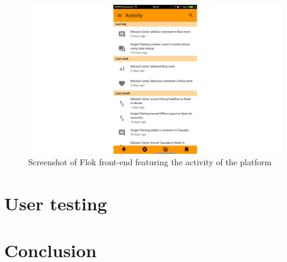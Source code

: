 \documentclass[a4paper,12pt, oneside]{article}
\begin{document}
\begin{figure}[!htb]
\centering
\includegraphics[width=\textwidth]{images/activity.png}
\caption{Screenshot of Flok front-end featuring the activity of the platform}
\label{fig.activity}
\end{figure}

\section{User testing}

\section{Conclusion}

\clearpage


\end{document}
